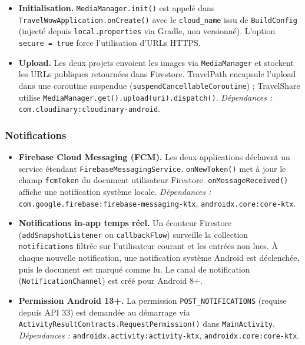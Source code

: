 \documentclass[a4paper, 12pt]{article}
\begin{document}
\begin{justify}
\begin{itemize}
    \item \textbf{Initialisation.}
    \texttt{MediaManager.\allowbreak{}init()} est appelé dans \texttt{TravelWowApplication.\allowbreak{}onCreate()} avec le \texttt{cloud\_name} issu de \texttt{BuildConfig} (injecté depuis \texttt{local.\allowbreak{}properties} via Gradle, non versionné). L'option \texttt{secure = true} force l'utilisation d'URLs HTTPS.

    \item \textbf{Upload.}
    Les deux projets envoient les images via \texttt{MediaManager} et stockent les URLs publiques retournées dans Firestore. TravelPath encapsule l'upload dans une coroutine suspendue (\texttt{suspendCancellableCoroutine}) ; TravelShare utilise \texttt{MediaManager.\allowbreak{}get().\allowbreak{}upload(uri).\allowbreak{}dispatch()}.
    \newline\textit{Dépendances :} \texttt{com.\allowbreak{}cloudinary:\allowbreak{}cloudinary-android}.

\end{itemize}

\subsubsection*{Notifications}

\begin{itemize}

    \item \textbf{Firebase Cloud Messaging (FCM).}
    Les deux applications déclarent un service étendant \texttt{FirebaseMessagingService}. \texttt{onNewToken()} met à jour le champ \texttt{fcmToken} du document utilisateur Firestore. \texttt{onMessageReceived()} affiche une notification système locale.
    \newline\textit{Dépendances :} \texttt{com.\allowbreak{}google.\allowbreak{}firebase:\allowbreak{}firebase-messaging-ktx}, \texttt{androidx.\allowbreak{}core:\allowbreak{}core-ktx}.

    \item \textbf{Notifications in-app temps réel.}
    Un écouteur Firestore (\texttt{addSnapshotListener} ou \texttt{callbackFlow}) surveille la collection \texttt{notifications} filtrée sur l'utilisateur courant et les entrées non lues. À chaque nouvelle notification, une notification système Android est déclenchée, puis le document est marqué comme lu. Le canal de notification (\texttt{NotificationChannel}) est créé pour Android 8+.

    \item \textbf{Permission Android 13+.}
    La permission \texttt{POST\_NOTIFICATIONS} (requise depuis API 33) est demandée au démarrage via \texttt{ActivityResultContracts.\allowbreak{}RequestPermission()} dans \texttt{MainActivity}.
    \newline\textit{Dépendances :} \texttt{androidx.\allowbreak{}activity:\allowbreak{}activity-ktx}, \texttt{androidx.\allowbreak{}core:\allowbreak{}core-ktx}.


\end{itemize}
\end{justify}
\end{document}
